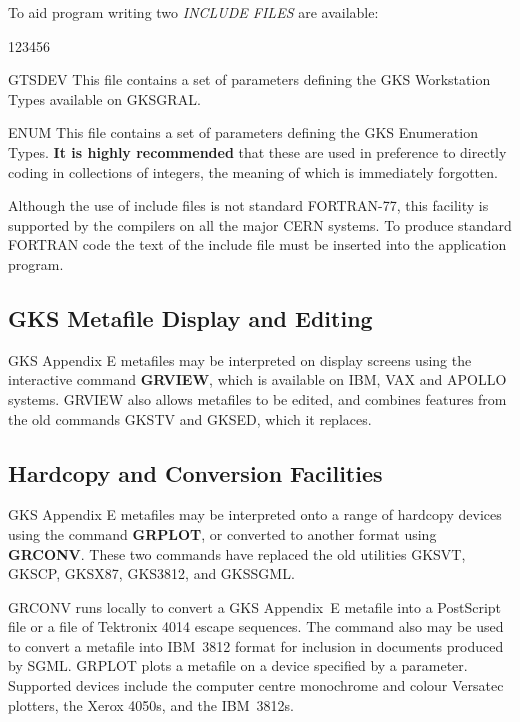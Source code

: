 To aid program writing two {\it INCLUDE FILES} are available:
\begin{DLtt}{123456}
\item[GTSDEV]This file contains a set of parameters
defining the GKS Workstation Types available on GKSGRAL.
\item[ENUM]This file contains a set of parameters
defining the GKS Enumeration Types. {\bf It is highly recommended}
that these are used in preference to directly coding in collections of
integers, the meaning of which is immediately forgotten.
\end{DLtt}
 
Although the use of include files is not standard FORTRAN-77,
this facility is supported by the compilers on all the major CERN systems.
To produce standard FORTRAN code the text of the include file must be inserted
into the application program.
\subsection{GKS Metafile Display and Editing}
 
GKS Appendix E metafiles may be interpreted on display screens
using the interactive command {\bf GRVIEW}, which is available on
IBM, VAX and APOLLO systems. GRVIEW also allows metafiles to be edited,
and combines features from the old commands GKSTV and GKSED, which
it replaces.
\subsection{Hardcopy and Conversion Facilities}
 
GKS Appendix E metafiles may be interpreted onto a range of hardcopy
devices using the command {\bf GRPLOT}, or converted to
another format using {\bf GRCONV}. These two commands have replaced
the old utilities GKSVT, GKSCP, GKSX87, GKS3812, and GKSSGML.
 
GRCONV runs locally to convert a GKS Appendix~E metafile into a PostScript
file or a file of Tektronix 4014 escape sequences. The command also may
be used to convert a metafile into IBM~3812 format for inclusion
in documents produced by SGML.
GRPLOT plots a metafile on a device specified by a parameter.
Supported devices include the computer centre monochrome and colour
Versatec plotters, the Xerox 4050s, and the IBM~3812s.
 
